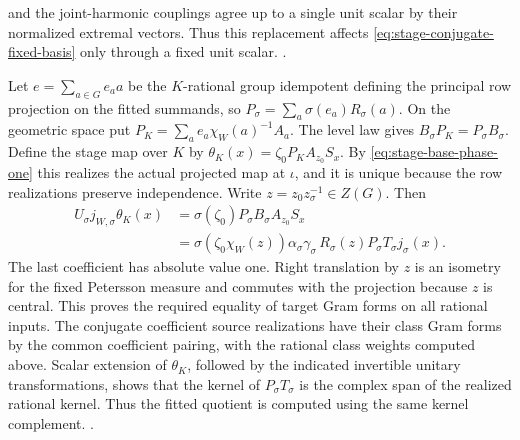 and the joint-harmonic couplings agree up to a single
unit scalar by their normalized extremal vectors.
Thus this replacement affects
\eqref{eq:stage-conjugate-fixed-basis} only through a
fixed unit scalar.
.

Let \(e=\sum_{a\in G}e_a a\) be the \(K\)-rational group
idempotent defining the principal row projection on
the fitted summands, so
\(P_\sigma=\sum_a\sigma(e_a)R_\sigma(a)\). On the
geometric space put
\(P_K=\sum_a e_a\chi_W(a)^{-1}A_a\).
The level law gives \(B_\sigma P_K=P_\sigma B_\sigma\).
Define the stage map over \(K\) by
\(\theta_K(x)=\zeta_0 P_K A_{z_0}S_x\).
By \eqref{eq:stage-base-phase-one} this realizes the
actual projected map at \(\iota\), and it is unique
because the row realizations preserve independence.
Write \(z=z_0 z_\sigma^{-1}\in Z(G)\). Then
\[
\begin{split}
 U_\sigma j_{W,\sigma}\theta_K(x)
  &= \sigma(\zeta_0)P_\sigma B_\sigma A_{z_0}S_x \\
  &=\sigma(\zeta_0\chi_W(z))\alpha_\sigma\gamma_\sigma\,
             R_\sigma(z)P_\sigma T_\sigma j_\sigma(x).
\end{split}
\]
The last coefficient has absolute value one.
Right translation by \(z\) is an isometry for the
fixed Petersson measure and commutes with the
projection because \(z\) is central. This proves
the required equality of target Gram forms on all
rational inputs. The conjugate coefficient source
realizations have their class Gram forms by the
common coefficient pairing, with the rational class
weights computed above. Scalar extension of
\(\theta_K\), followed by the indicated invertible
unitary transformations, shows that the kernel of
\(P_\sigma T_\sigma\) is the complex span of the
realized rational kernel. Thus the fitted quotient
is computed using the same kernel complement.
.


